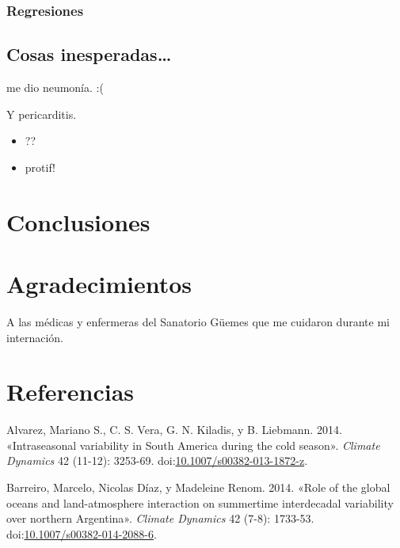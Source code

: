 \documentclass[spanish,a4paper,12p]{book}
\providecommand{\tightlist}{%
  \setlength{\itemsep}{0pt}\setlength{\parskip}{0pt}}
\begin{document}
\subsection{Regresiones}\label{regresiones-1}


\section{Cosas inesperadas\ldots{}}\label{cosas-inesperadas}

me dio neumonía. :(

Y pericarditis.

\begin{itemize}
\tightlist
\item
  ??
\item
  protif!
\end{itemize}

\chapter{Conclusiones}\label{conclusiones}

\chapter{Agradecimientos}\label{agradecimientos}

A las médicas y enfermeras del Sanatorio Güemes que me cuidaron durante
mi internación.

\chapter*{Referencias}\label{referencias}

\hypertarget{refs}{}
\hypertarget{ref-Alvarez2014}{}
Alvarez, Mariano S., C. S. Vera, G. N. Kiladis, y B. Liebmann. 2014.
«Intraseasonal variability in South America during the cold season».
\emph{Climate Dynamics} 42 (11-12): 3253-69.
doi:\href{https://doi.org/10.1007/s00382-013-1872-z}{10.1007/s00382-013-1872-z}.

\hypertarget{ref-Barreiro2014}{}
Barreiro, Marcelo, Nicolas Díaz, y Madeleine Renom. 2014. «Role of the
global oceans and land-atmosphere interaction on summertime interdecadal
variability over northern Argentina». \emph{Climate Dynamics} 42 (7-8):
1733-53.
doi:\href{https://doi.org/10.1007/s00382-014-2088-6}{10.1007/s00382-014-2088-6}.
\end{document}
